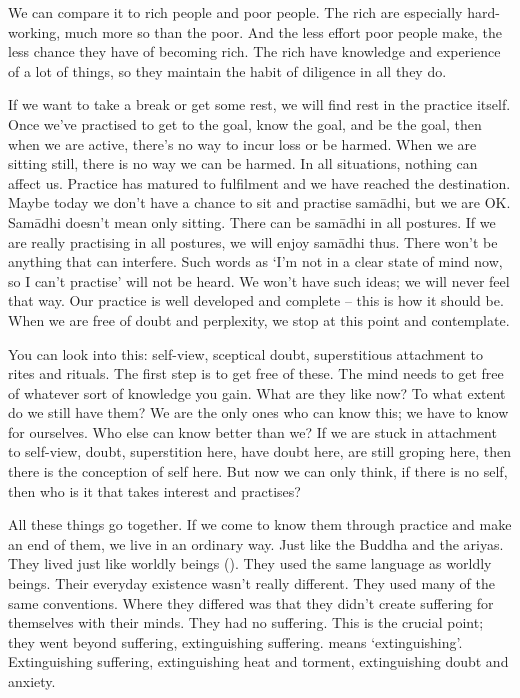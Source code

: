 We can compare it to rich people and poor people. The rich are especially hard-working, much more so than the poor. And the less effort poor people make, the less chance they have of becoming rich. The rich have knowledge and experience of a lot of things, so they maintain the habit of diligence in all they do.

If we want to take a break or get some rest, we will find rest in the practice itself. Once we've practised to get to the goal, know the goal, and be the goal, then when we are active, there's no way to incur loss or be harmed. When we are sitting still, there is no way we can be harmed. In all situations, nothing can affect us. Practice has matured to fulfilment and we have reached the destination. Maybe today we don't have a chance to sit and practise sam\=adhi, but we are OK. Sam\=adhi doesn't mean only sitting. There can be sam\=adhi in all postures. If we are really practising in all postures, we will enjoy sam\=adhi thus. There won't be anything that can interfere. Such words as `I'm not in a clear state of mind now, so I can't practise' will not be heard. We won't have such ideas; we will never feel that way. Our practice is well developed and complete -- this is how it should be. When we are free of doubt and perplexity, we stop at this point and contemplate.

You can look into this: self-view, sceptical doubt, superstitious attachment to rites and rituals. The first step is to get free of these. The mind needs to get free of whatever sort of knowledge you gain. What are they like now? To what extent do we still have them? We are the only ones who can know this; we have to know for ourselves. Who else can know better than we? If we are stuck in attachment to self-view, doubt, superstition here, have doubt here, are still groping here, then there is the conception of self here. But now we can only think, if there is no self, then who is it that takes interest and practises?

All these things go together. If we come to know them through practice and make an end of them, we live in an ordinary way. Just like the Buddha and the ariyas. They lived just like worldly beings (). They used the same language as worldly beings. Their everyday existence wasn't really different. They used many of the same conventions. Where they differed was that they didn't create suffering for themselves with their minds. They had no suffering. This is the crucial point; they went beyond suffering, extinguishing suffering.  means `extinguishing'. Extinguishing suffering, extinguishing heat and torment, extinguishing doubt and anxiety.

